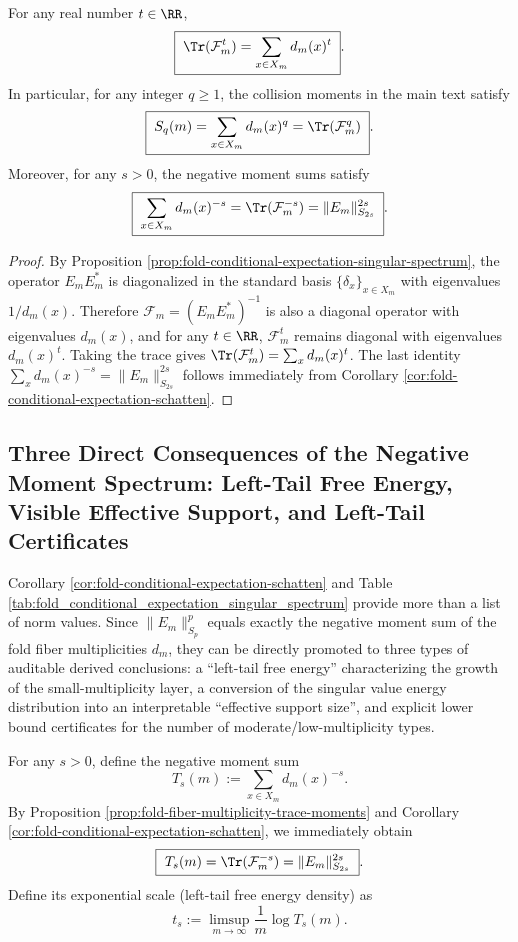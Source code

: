 \begin{proposition}\label{prop:fold-fiber-multiplicity-trace-moments}
For any real number \(t\in\RR\),
\[
\boxed{\;
\Tr(\mathcal{F}_m^{t})=\sum_{x\in X_m} d_m(x)^{t}\; }.
\]
In particular, for any integer \(q\ge 1\), the collision moments in the main text satisfy
\[
\boxed{\;
S_q(m)=\sum_{x\in X_m}d_m(x)^q=\Tr(\mathcal{F}_m^{q})\; }.
\]
Moreover, for any \(s>0\), the negative moment sums satisfy
\[
\boxed{\;
\sum_{x\in X_m}d_m(x)^{-s}=\Tr(\mathcal{F}_m^{-s})=\|E_m\|_{S_{2s}}^{2s}\; }.
\]
\end{proposition}
\begin{proof}
By Proposition \ref{prop:fold-conditional-expectation-singular-spectrum}, the operator \(E_mE_m^\ast\) is diagonalized in the standard basis \(\{\delta_x\}_{x\in X_m}\) with eigenvalues \(1/d_m(x)\).
Therefore \(\mathcal{F}_m=(E_mE_m^\ast)^{-1}\) is also a diagonal operator with eigenvalues \(d_m(x)\), and for any \(t\in\RR\), \(\mathcal{F}_m^t\) remains diagonal with eigenvalues \(d_m(x)^t\).
Taking the trace gives \(\Tr(\mathcal{F}_m^{t})=\sum_x d_m(x)^t\).
The last identity \(\sum_x d_m(x)^{-s}=\|E_m\|_{S_{2s}}^{2s}\) follows immediately from Corollary \ref{cor:fold-conditional-expectation-schatten}. \qedhere
\end{proof}

\subsection{Three Direct Consequences of the Negative Moment Spectrum: Left-Tail Free Energy, Visible Effective Support, and Left-Tail Certificates}\label{app:op-algebra-negative-moment-consequences}

Corollary \ref{cor:fold-conditional-expectation-schatten} and Table \ref{tab:fold_conditional_expectation_singular_spectrum} provide more than a list of norm values.
Since \(\|E_m\|_{S_p}^p\) equals exactly the negative moment sum of the fold fiber multiplicities \(d_m\), they can be directly promoted to three types of auditable derived conclusions: a ``left-tail free energy'' characterizing the growth of the small-multiplicity layer, a conversion of the singular value energy distribution into an interpretable ``effective support size'', and explicit lower bound certificates for the number of moderate/low-multiplicity types.

\begin{definition}\label{def:fold-negative-moment-sum-left-tail}
For any \(s>0\), define the negative moment sum
\[
T_s(m):=\sum_{x\in X_m} d_m(x)^{-s}.
\]
By Proposition \ref{prop:fold-fiber-multiplicity-trace-moments} and Corollary \ref{cor:fold-conditional-expectation-schatten}, we immediately obtain
\[
\boxed{\ T_s(m)=\Tr(\mathcal{F}_m^{-s})=\|E_m\|_{S_{2s}}^{2s}\ }.
\]
Define its exponential scale (left-tail free energy density) as
\[
t_s:=\limsup_{m\to\infty}\frac{1}{m}\log T_s(m).
\]
\end{definition}

